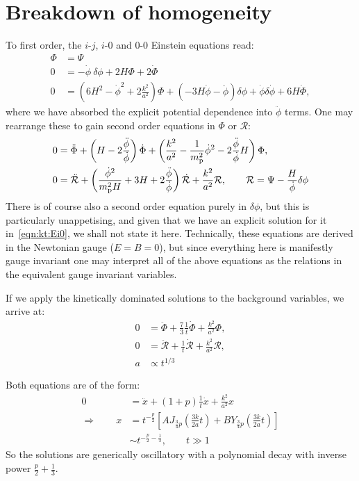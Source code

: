 \section{Breakdown of homogeneity}
To first order, the $i$-$j$, $i$-$0$ and $0$-$0$ Einstein equations read:
\begin{align}
  \Phi &= \Psi 
  \label{eqn:kt:Eij} \\
  0 &= -\dot{\phi}\:\delta\phi  + 2 H \Phi + 2 \dot{\Phi} 
  \label{eqn:kt:Ei0}\\
  0 &= \left(6H^2-\dot{\phi}^2 + 2\frac{k^2}{a^2}\right)\Phi  + \left( -3H\dot{\phi} - \ddot{\phi} \right)\delta\phi + \dot{\phi}\delta\dot{\phi} +  6 H \dot{\Phi},
  \label{eqn:kt:E00}
\end{align}
where we have absorbed the explicit potential dependence into $\ddot{\phi}$ terms. 
One may rearrange these to gain second order equations in $\Phi$ or $\mathcal{R}$:
\begin{align}
  0 &= \ddot{\Phi} + \left( H - 2 \frac{\ddot{\phi}}{\dot{\phi}} \right) \dot{\Phi} + \left( \frac{k^2}{a^2}-\frac{1}{m_{\mathrm{p}}^2}\dot{\phi}^2 - 2\frac{\ddot{\phi}}{\dot{\phi}}H \right)\Phi, \\
  0 &= \ddot{\mathcal{R}} + \left( \frac{\dot{\phi}^2}{m_{\mathrm{p}}^2H} + 3H + 2\frac{\ddot{\phi}}{\dot{\phi}} \right)\dot{\mathcal{R}} + \frac{k^2}{a^2}\mathcal{R}, \qquad \mathcal{R} = \Psi - \frac{H}{\dot{\phi}}\delta\phi
\end{align}
There is of course also a second order equation purely in $\delta\phi$, but this is particularly unappetising, and given that we have an explicit solution for it in~\eqref{eqn:kt:Ei0}, we shall not state it here.
Technically, these equations are derived in the Newtonian gauge ($E=B=0$), but since everything here is manifestly gauge invariant one may interpret all of the above equations as the relations in the equivalent gauge invariant variables.

If we apply the kinetically dominated solutions to the background variables, we arrive at:
\begin{align}
  0 &= \ddot{\Phi} + \frac{7}{3}\frac{1}{t}\dot{\Phi} + \frac{k^2}{a^2} \Phi,\\
  0 &= \ddot{\mathcal{R}} + \frac{1}{t}\dot{\mathcal{R}} + \frac{k^2}{a^2} \mathcal{R},\\
  a &\propto t^{1/3}
\end{align}

Both equations are of the form:
\begin{align}
  0 &=\ddot{x} + (1+p)\frac{1}{t}\dot{x} + \frac{k^2}{a^2} x  \\
  \Rightarrow \qquad
  x &= t^{-\frac{p}{2}}\left[ A J_{\frac{3}{4}p}\left( \frac{3k}{2a} t \right) + B Y_{\frac{3}{4}p}\left( \frac{3k}{2a} t \right) \right] \\
  &\sim  t^{-\frac{p}{2}-\frac{1}{3}}, \qquad t \gg 1
\end{align}
So the solutions are generically oscillatory with a polynomial decay with inverse power $\frac{p}{2} + \frac{1}{3}$.

